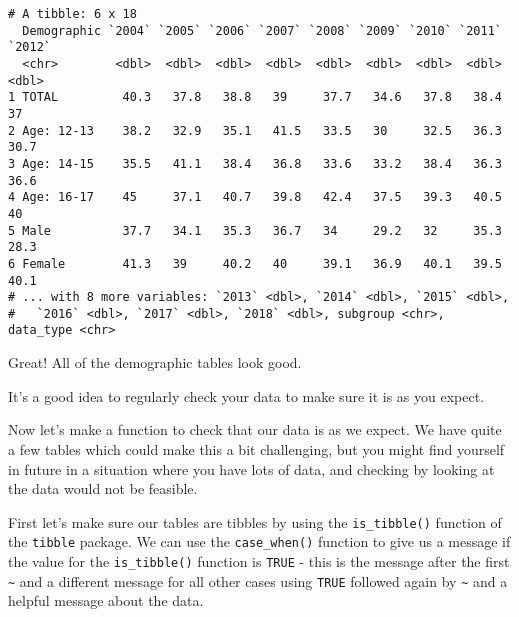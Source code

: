 \documentclass[
]{article}
\newenvironment{Shaded}{\begin{snugshade}}{\end{snugshade}}
\newcommand{\DataTypeTok}[1]{\textcolor[rgb]{0.13,0.29,0.53}{#1}}
\newcommand{\FloatTok}[1]{\textcolor[rgb]{0.00,0.00,0.81}{#1}}
\newcommand{\KeywordTok}[1]{\textcolor[rgb]{0.13,0.29,0.53}{\textbf{#1}}}
\newcommand{\NormalTok}[1]{#1}
\newcommand{\OperatorTok}[1]{\textcolor[rgb]{0.81,0.36,0.00}{\textbf{#1}}}
\newcommand{\StringTok}[1]{\textcolor[rgb]{0.31,0.60,0.02}{#1}}
\begin{document}
\begin{Shaded}
\end{Shaded}

\begin{verbatim}
# A tibble: 6 x 18
  Demographic `2004` `2005` `2006` `2007` `2008` `2009` `2010` `2011` `2012`
  <chr>        <dbl>  <dbl>  <dbl>  <dbl>  <dbl>  <dbl>  <dbl>  <dbl>  <dbl>
1 TOTAL         40.3   37.8   38.8   39     37.7   34.6   37.8   38.4   37  
2 Age: 12-13    38.2   32.9   35.1   41.5   33.5   30     32.5   36.3   30.7
3 Age: 14-15    35.5   41.1   38.4   36.8   33.6   33.2   38.4   36.3   36.6
4 Age: 16-17    45     37.1   40.7   39.8   42.4   37.5   39.3   40.5   40  
5 Male          37.7   34.1   35.3   36.7   34     29.2   32     35.3   28.3
6 Female        41.3   39     40.2   40     39.1   36.9   40.1   39.5   40.1
# ... with 8 more variables: `2013` <dbl>, `2014` <dbl>, `2015` <dbl>,
#   `2016` <dbl>, `2017` <dbl>, `2018` <dbl>, subgroup <chr>, data_type <chr>
\end{verbatim}

Great! All of the demographic tables look good.

It's a good idea to regularly check your data to make sure it is as you
expect.

Now let's make a function to check that our data is as we expect. We
have quite a few tables which could make this a bit challenging, but you
might find yourself in future in a situation where you have lots of
data, and checking by looking at the data would not be feasible.

First let's make sure our tables are tibbles by using the
\texttt{is\_tibble()} function of the \texttt{tibble} package. We can
use the \texttt{case\_when()} function to give us a message if the value
for the \texttt{is\_tibble()} function is \texttt{TRUE} - this is the
message after the first \texttt{\textasciitilde{}} and a different
message for all other cases using \texttt{TRUE} followed again by
\texttt{\textasciitilde{}} and a helpful message about the data.
\end{document}
